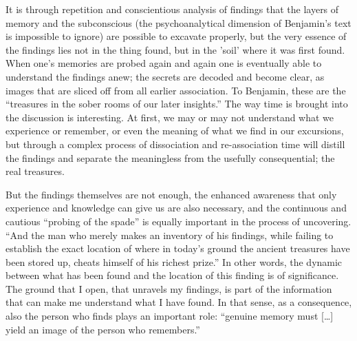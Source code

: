 \documentclass[11pt,a4paper]{article}
\begin{document}
\noindent
It is through repetition and conscientious analysis of findings that the layers of memory and the subconscious (the psychoanalytical dimension of Benjamin's text is impossible to ignore) are possible to excavate properly, but the very essence of the findings lies not in the thing found, but in the 'soil' where it was first found. When one's memories are probed again and again one is eventually able to understand the findings anew; the secrets are decoded and become clear, as images that are sliced off from all earlier association. To Benjamin, these are the ``treasures in the sober rooms of our later insights.'' \citep[p. 576]{benjamin2005} The way time is brought into the discussion is interesting. At first, we may or may not understand what we experience or remember, or even the meaning of what we find in our excursions, but through a complex process of dissociation and re-association time will distill the findings and separate the meaningless from the usefully consequential; the real treasures.

But the findings themselves are not enough, the enhanced awareness that only experience and knowledge can give us are also necessary, and the continuous and cautious ``probing of the spade'' is equally important in the process of uncovering. ``And the man who merely makes an inventory of his findings, while failing to establish the exact location of where in today’s ground the ancient treasures have been stored up, cheats himself of his richest prize.'' \citep[p. 576]{benjamin2005} In other words, the dynamic between what has been found and the location of this finding is of significance. The ground that I open, that unravels my findings, is part of the information that can make me understand what I have found. In that sense, as a consequence, also the person who finds plays an important role: ``genuine memory must [\ldots] yield an image of the person who remembers.'' \citep[p. 576]{benjamin2005}
\end{document}
